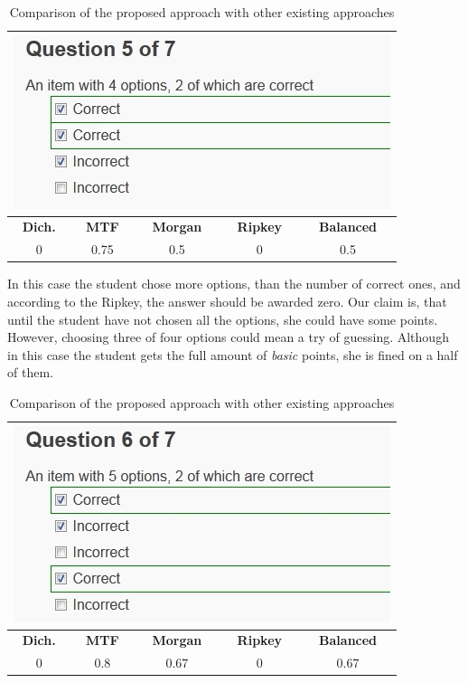 \begin{table}[h!]
	\centering
	\begin{tabularx}{0.5\columnwidth}{c c c c c} 
	\toprule  
    \multicolumn{5}{c}{\includegraphics[width=0.5\columnwidth]{images/case5.jpg}}\\
    \midrule
    \textbf{Dich.}&\textbf{MTF}&\textbf{Morgan}&\textbf{Ripkey}&\textbf{Balanced}\\
	\midrule
    0&0.75&0.5&0&0.5\\
	\bottomrule
    \end{tabularx}
	\caption{Comparison of the proposed approach with other existing approaches}
	\label{tab:case 5}
\end{table}

\begin{example}
In this case the student chose more options, than the number of correct ones, and according to the Ripkey, the answer should be awarded zero.
Our claim is, that until the student have not chosen all the options, she could have some points.
However, choosing three of four options could mean a try of guessing.
Although in this case the student gets the full amount of \textit{basic} points, she is fined on a half of them.
\end{example}

\begin{table}[h!]
	\centering
	\begin{tabularx}{0.5\columnwidth}{c c c c c} 
	\toprule  
    \multicolumn{5}{c}{\includegraphics[width=0.5\columnwidth]{images/case6.jpg}}\\
    \midrule
    \textbf{Dich.}&\textbf{MTF}&\textbf{Morgan}&\textbf{Ripkey}&\textbf{Balanced}\\
	\midrule
    0&0.8&0.67&0&0.67\\
	\bottomrule
    \end{tabularx}
	\caption{Comparison of the proposed approach with other existing approaches}
	\label{tab:case 6}
\end{table}

